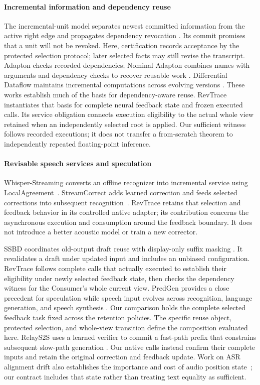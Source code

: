 \paragraph{Incremental information and dependency reuse}
The incremental-unit model separates newest committed information from
the active right edge and propagates dependency revocation
\cite{schlangen2011incremental}. Its commit promises that a unit will not
be revoked. Here, certification records acceptance by the protected
selection protocol; later selected facts may still revise the transcript.
Adapton checks recorded dependencies; Nominal Adapton combines names with
arguments and dependency checks to recover reusable work
\cite{hammer2014adapton,hammer2015names}. Differential Dataflow maintains
incremental computations across evolving versions
\cite{mcsherry2013differential}. These works establish much of the basis for
dependency-aware reuse. RevTrace instantiates that basis for complete
neural feedback state and frozen executed calls. Its service obligation
connects execution eligibility to the actual whole view retained when an
independently selected root is applied.
Our sufficient witness follows recorded executions; it does not transfer a
from-scratch theorem to independently repeated floating-point inference.

\paragraph{Revisable speech services and speculation}
Whisper-Streaming converts an offline recognizer into incremental service
using LocalAgreement~\cite{machacek2023whisperstreaming}. StreamCorrect
adds learned correction and feeds selected corrections into subsequent
recognition~\cite{vu2026streamcorrect}. RevTrace retains that selection and
feedback behavior in its controlled native adapter; its contribution
concerns the asynchronous execution and consumption around the feedback
boundary. It does not introduce a better acoustic model or train a new
corrector.

SSBD coordinates old-output draft reuse with display-only suffix masking
\cite{zeng2026ssbd}. It revalidates a draft under updated input and includes
an unbiased configuration. RevTrace follows complete calls that actually
executed to establish their eligibility under newly selected feedback state,
then checks the dependency witness for the Consumer's whole current view.
PredGen provides a close precedent for speculation while speech input
evolves across recognition, language generation, and speech synthesis
\cite{li2025predgen}. Our comparison holds the complete selected feedback
task fixed across the retention policies. The specific reuse object,
protected selection, and whole-view transition define the composition
evaluated here. RelayS2S uses a learned verifier to commit a fast-path
prefix that constrains subsequent slow-path generation
\cite{mai2026relays2s}. Our native calls instead confirm their complete
inputs and retain the original correction and feedback update. Work on
ASR alignment drift also establishes the importance and cost of audio
position state~\cite{wang2026alignmentdrift}; our contract includes that
state rather than treating text equality as sufficient.

